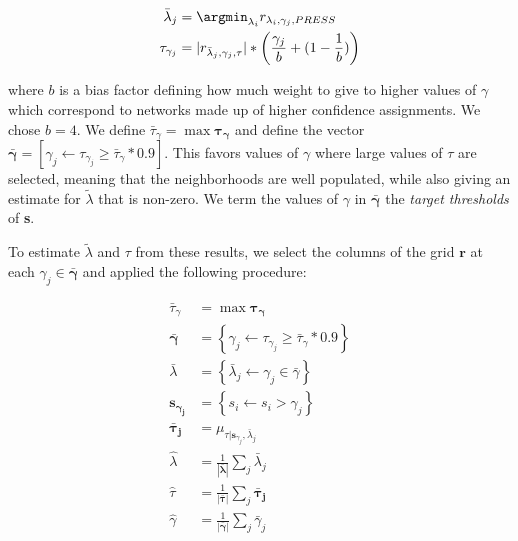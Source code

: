     \begin{align}
        {\bar \lambda_j} &= \argmin_{\lambda_i}{r_{\lambda_i, \gamma_j, PRESS}} \\
        \tau_{\gamma_j} &= |r_{{\bar \lambda_j}, \gamma_j, \tau}| * \left(
            \frac{\gamma_j}{b} + (1 - \frac{1}{b})\right)
    \end{align}

    \noindent where $b$ is a bias factor defining how much
    weight to give to higher values of $\gamma$ which
    correspond to networks made up of higher confidence
    assignments. We chose $b = 4$. We define ${\bar \tau_\gamma} =
    \max{\mathbf{\tau_\gamma}}$ and define the  vector
    $\mathbf{\bar \gamma} = \left[\gamma_j \leftarrow\tau_{\gamma_j}
    \ge {\bar \tau_\gamma} * 0.9\right]$. This favors values of
    $\gamma$ where large values of $\tau$ are selected, meaning that
    the neighborhoods are well populated, while also giving an estimate
    for ${\tilde \lambda}$ that is non-zero. We term the values of
    $\gamma$ in $\mathbf{{\bar \gamma}}$ the {\em target thresholds}
    of \textbf{s}.

        To estimate ${\tilde \lambda}$ and $\tau$ from these results,
    we select the columns of the grid $\mathbf{r}$ at each $\gamma_j
    \in \mathbf{{\bar \gamma}}$ and applied the following procedure:

    \begin{align}
    {\bar \tau_\gamma} &= \max{\mathbf{\tau_\gamma}}\\
    \mathbf{\bar \gamma} &= \left\{\gamma_j \leftarrow\tau_{\gamma_j}
        \ge {\bar \tau_\gamma} * 0.9\right\}\\
    {\bar \lambda} &= \left\{ {\bar \lambda_j} \leftarrow \gamma_j \in {\bar \gamma}\right\}\\
    \mathbf{s_{\gamma_j}} &= \left\{s_i \leftarrow s_i > \gamma_j\right\} \\
    \mathbf{{\bar \tau_j}} &= \mu_{\tau|\mathbf{s}_{\gamma_j}, {\bar \lambda}_j}\\
    {\hat \lambda} &= \frac{1}{|\mathbf{{\bar \lambda}}|}\sum_j {\bar \lambda}_j\\
    {\hat \tau} &= \frac{1}{|\mathbf{{\bar \tau}}|}\sum_j \mathbf{{\bar \tau_j}}\\
    {\hat \gamma} &= \frac{1}{|\mathbf{{\bar \gamma}}|}\sum_j {\bar \gamma}_j
    \end{align}

